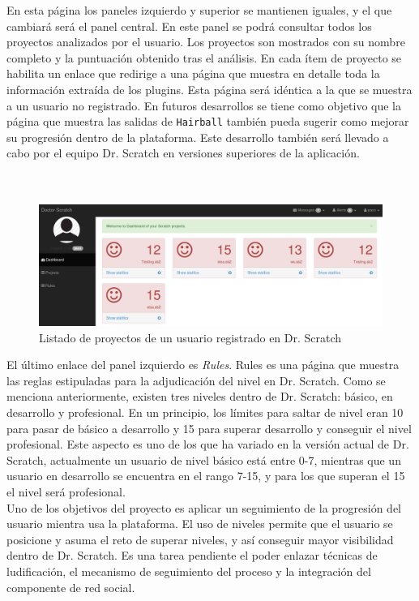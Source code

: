 \documentclass[a4paper, 12pt]{book}
\begin{document}
En esta página los paneles izquierdo y superior se mantienen iguales, y el que cambiará será
el panel central. En este panel se podrá consultar todos los proyectos analizados por el usuario. 
Los proyectos son mostrados con su nombre completo y la puntuación obtenido tras el análisis. 
En cada ítem de proyecto se habilita un enlace que redirige a una página que muestra en detalle
toda la información extraída de los plugins. Esta página será idéntica a la que se muestra a un
usuario no registrado. En futuros desarrollos se tiene como objetivo que la página que muestra
las salidas de \texttt{Hairball} también pueda sugerir como mejorar su progresión dentro de la
plataforma. Este desarrollo también será llevado a cabo por el equipo Dr. Scratch en versiones
superiores de la aplicación. \\ \\ \\ 


\begin{figure}
	\graphicspath{{img/}}
  \includegraphics[bb=0 0 800 600, width=12cm, keepaspectratio]{proyectos.png}
	\caption{Listado de proyectos de un usuario registrado en Dr. Scratch}
  \label{figura:foro_hilos}
\end{figure}


El último enlace del panel izquierdo es \emph{Rules}. Rules es una página que muestra
las reglas estipuladas para la adjudicación del nivel en Dr. Scratch. Como se menciona
anteriormente, existen tres niveles dentro de Dr. Scratch: básico, en desarrollo y 
profesional. En un principio, los límites para saltar de nivel eran 10 para pasar de 
básico a desarrollo y 15 para superar desarrollo y conseguir el nivel profesional. Este
aspecto es uno de los que ha variado en la versión actual de Dr. Scratch, actualmente
un usuario de nivel básico está entre 0-7, mientras que un usuario en desarrollo se
encuentra en el rango 7-15, y para los que superan el 15 el nivel será profesional. \\

Uno de los objetivos del proyecto es aplicar un seguimiento de la progresión del 
usuario mientra usa la plataforma. El uso de niveles permite que el usuario se posicione
y asuma el reto de superar niveles, y así conseguir mayor visibilidad dentro de Dr. 
Scratch. Es una tarea pendiente el poder enlazar técnicas de ludificación, el mecanismo
de seguimiento del proceso y la integración del componente de red social. \\ \\
\end{document}
